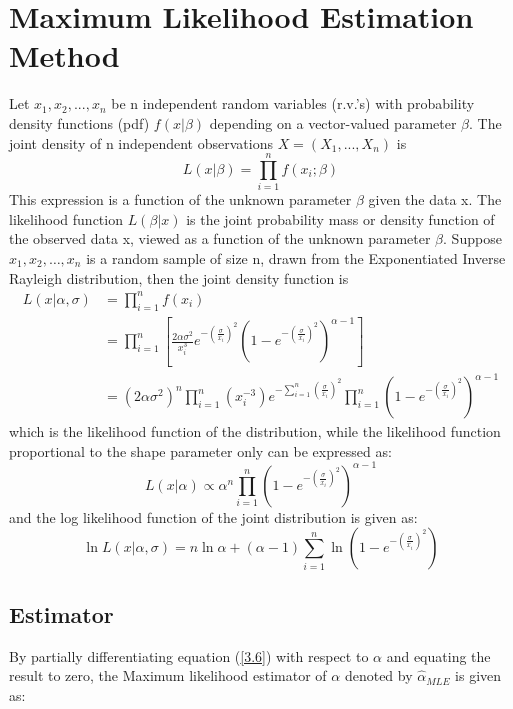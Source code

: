 \documentclass[a4paper,12pt]{report}
\begin{document}
\section{Maximum Likelihood Estimation Method}
Let $x_1,x_2,...,x_n$ be n independent random variables (r.v.’s) with probability density functions (pdf)  $f(x|\beta)$ depending on a vector-valued parameter  $\beta$. The joint density of  n independent observations  $X=(X_1,...,X_n)$ is 
\begin{equation}\label{3.3}
L(x|\beta ) = \prod\limits_{i = 1}^n {f({x_i};\beta )}
\end{equation}
This expression is a function of the unknown parameter $\beta$ given the data x. The likelihood function $L(\beta|x)$ is the joint probability mass or density function of the observed data x, viewed as a function of the unknown parameter $\beta$. Suppose $x_1,x_2,\dots,x_n$ is a random sample of size n, drawn from the Exponentiated Inverse Rayleigh distribution, then the joint density function is
\begin{equation}\label{3.4}
\begin{split}
L(x|\alpha ,\sigma ) &=  \prod\limits_{i=1}^{n}f(x_i)\\
&=\prod\limits_{i=1}^{n}\left[\frac{2\alpha\sigma^2}{x_i^3}e^{-(\frac{\sigma}{x_i})^2}\left(1-e^{-(\frac{\sigma}{x_i})^2}\right)^{\alpha-1}\right]\\
&=(2\alpha\sigma^2)^n\prod\limits_{i=1}^{n}(x_i^{-3})e^{-\sum\limits_{ i=1 }^{n}(\frac{\sigma}{x_i})^2}\prod\limits_{i=1}^{n}\left(1-e^{-(\frac{\sigma}{x_i})^2}\right)^{\alpha-1}
\end{split}
\end{equation}
\noindent which is the likelihood function of the distribution, while the likelihood function proportional to the shape parameter only can be expressed as:
\begin{equation}\label{3.5}
L(x|\alpha) \propto \alpha^n \prod\limits_{i=1}^{n}\left(1-e^{-(\frac{\sigma}{x_i})^2}\right)^{\alpha-1}
\end{equation}
\noindent and the log likelihood function of the joint distribution is given as:
\begin{equation}\label{3.6}
\ln L(x|\alpha ,\sigma ) = n\ln \alpha  + (\alpha  - 1){\sum\limits_{ i=1 }^{n} {\ln \left( {1 - {e^{ - {{\left( {\frac{\sigma }{x_i}} \right)}^2}}}} \right)}}
\end{equation}
\subsection{Estimator}
By partially differentiating equation (\ref{3.6}) with respect to $\alpha$ and equating the result to zero, the Maximum likelihood estimator of $\alpha$ denoted by $\hat{\alpha}_{MLE}$ is given as:
\end{document}
